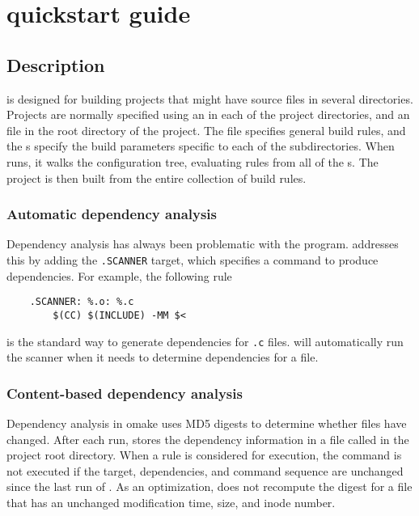 %
%
\chapter{\OMake{} quickstart guide}
\label{chapter:quickstart}

\section{Description}

 is designed for building projects that might have source files in several directories.
Projects are normally specified using an  in each of the project directories, and an
 file in the root directory of the project.  The  file specifies
general build rules, and the s specify the build parameters specific to each of the
subdirectories.  When  runs, it walks the configuration tree, evaluating rules from all
of the s.  The project is then built from the entire collection of build rules.

\subsection{Automatic dependency analysis}

Dependency analysis has always been problematic with the  program.  
addresses this by adding the \verb+.SCANNER+ target, which specifies a command to produce
dependencies.  For example, the following rule

\begin{verbatim}
    .SCANNER: %.o: %.c
        $(CC) $(INCLUDE) -MM $<
\end{verbatim}

is the standard way to generate dependencies for \verb+.c+ files.   will automatically
run the scanner when it needs to determine dependencies for a file.

\subsection{Content-based dependency analysis}

Dependency analysis in omake uses MD5 digests to determine whether files have changed.  After each
run,  stores the dependency information in a file called  in the project
root directory.  When a rule is considered for execution, the command is not executed if the target,
dependencies, and command sequence are unchanged since the last run of .  As an
optimization,  does not recompute the digest for a file that has an unchanged
modification time, size, and inode number.

